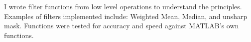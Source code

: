 \descript{ }
\vspace*{-\topsep}  %
\begin{justify}
I wrote filter functions from low level operations to understand the principles. Examples of filters implemented include: Weighted Mean, Median, and unsharp mask. Functions were tested for accuracy and speed against MATLAB's own functions.
\end{justify}
\sectionsep
